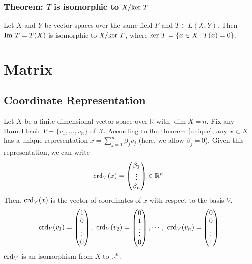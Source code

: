 \documentclass[11pt]{elegantbook}
\begin{document}
\subsection{Theorem: $T$ is isomorphic to $X/\textnormal{ker }T$}
\begin{theorem}
    Let $X$ and $Y$ be vector spaces over the same field $F$ and $T \in L(X, Y)$. Then $\textnormal{Im }T=T(X)$ is isomorphic to $X/\textnormal{ker }T$, where $\textnormal{ker }T=\{x\in X:T(x)=0\}$.
\end{theorem}





\chapter{Matrix}


\section{Coordinate Representation}
Let $X$ be a finite-dimensional vector space over $\mathbb{R}$ with $\dim X = n$. Fix any Hamel basis $V = \{v_1, ... , v_n\}$ of $X$. According to the theorem \ref{unique}, any $x \in X$ has a unique representation $x=\sum_{j=1}^n\beta_j v_j$ (here, we allow $\beta_j = 0$). Given this representation, we can write $$\textnormal{crd}_V(x)=\begin{pmatrix}
    \beta_1\\
    \vdots\\
    \beta_n
\end{pmatrix}\in \mathbb{R}^n$$
Then, $\textnormal{crd}_V(x)$ is the vector of coordinates of $x$ with respect to the basis $V$.
\begin{equation}
    \begin{aligned}
        \textnormal{crd}_V(v_1)=\begin{pmatrix}
            1\\
            0\\
            \vdots\\
            0
        \end{pmatrix},\
        \textnormal{crd}_V(v_2)=\begin{pmatrix}
            0\\
            1\\
            \vdots\\
            0
        \end{pmatrix},\cdots,\
        \textnormal{crd}_V(v_n)=\begin{pmatrix}
            0\\
            0\\
            \vdots\\
            1
        \end{pmatrix}
    \end{aligned}
    \nonumber
\end{equation}
$\textnormal{crd}_V$ is an isomorphism from $X$ to $\mathbb{R}^n$.
\end{document}
